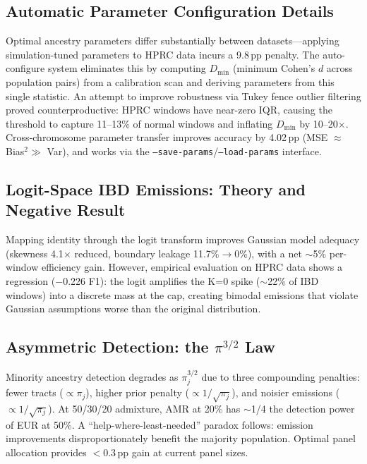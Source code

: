 \documentclass[11pt]{article}
\begin{document}
\subsection{Automatic Parameter Configuration Details}
\label{sec:supp_autoconfig}

Optimal ancestry parameters differ substantially between datasets---applying simulation-tuned parameters to HPRC data incurs a 9.8\,pp penalty. The auto-configure system eliminates this by computing $D_{\min}$ (minimum Cohen's $d$ across population pairs) from a calibration scan and deriving parameters from this single statistic. An attempt to improve robustness via Tukey fence outlier filtering proved counterproductive: HPRC windows have near-zero IQR, causing the threshold to capture 11--13\% of normal windows and inflating $D_{\min}$ by 10--20$\times$. Cross-chromosome parameter transfer improves accuracy by 4.02\,pp (MSE $\approx$ Bias$^2 \gg$ Var), and works via the \texttt{--save-params}/\texttt{--load-params} interface.

\subsection{Logit-Space IBD Emissions: Theory and Negative Result}
\label{sec:supp_logit}

Mapping identity through the logit transform improves Gaussian model adequacy (skewness 4.1$\times$ reduced, boundary leakage 11.7\%$\to$0\%), with a net $\sim$5\% per-window efficiency gain. However, empirical evaluation on HPRC data shows a regression ($-$0.226 F1): the logit amplifies the K=0 spike ($\sim$22\% of IBD windows) into a discrete mass at the cap, creating bimodal emissions that violate Gaussian assumptions worse than the original distribution.

\subsection{Asymmetric Detection: the \texorpdfstring{$\pi^{3/2}$}{pi\^{}(3/2)} Law}
\label{sec:supp_pi_law}

Minority ancestry detection degrades as $\pi_j^{3/2}$ due to three compounding penalties: fewer tracts ($\propto \pi_j$), higher prior penalty ($\propto 1/\sqrt{\pi_j}$), and noisier emissions ($\propto 1/\sqrt{\pi_j}$). At 50/30/20 admixture, AMR at 20\% has $\sim$1/4 the detection power of EUR at 50\%. A ``help-where-least-needed'' paradox follows: emission improvements disproportionately benefit the majority population. Optimal panel allocation provides $<$0.3\,pp gain at current panel sizes.
\end{document}
